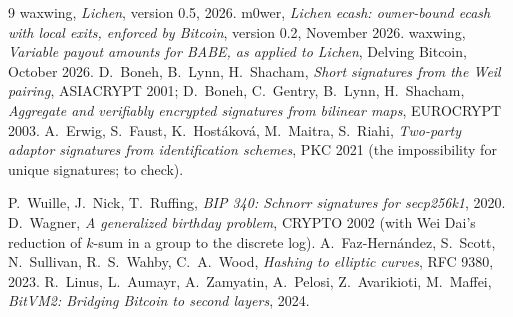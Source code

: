 \documentclass[11pt]{article}
\theoremstyle{plain}
\theoremstyle{definition}
\begin{document}
\begin{thebibliography}{9}
 waxwing, \emph{Lichen}, version 0.5, 2026.
 m0wer, \emph{Lichen ecash: owner-bound ecash with local
  exits, enforced by Bitcoin}, version 0.2, November 2026.
 waxwing, \emph{Variable payout amounts for BABE, as
  applied to Lichen}, Delving Bitcoin, October 2026.
 D.~Boneh, B.~Lynn, H.~Shacham, \emph{Short signatures from
  the Weil pairing}, ASIACRYPT 2001; D.~Boneh, C.~Gentry, B.~Lynn,
  H.~Shacham, \emph{Aggregate and verifiably encrypted signatures from
  bilinear maps}, EUROCRYPT 2003.
 A.~Erwig, S.~Faust, K.~Hostáková, M.~Maitra, S.~Riahi,
  \emph{Two-party adaptor signatures from identification schemes}, PKC
  2021 (the impossibility for unique signatures; to check).

 P.~Wuille, J.~Nick, T.~Ruffing, \emph{BIP 340: Schnorr
  signatures for secp256k1}, 2020.
 D.~Wagner, \emph{A generalized birthday problem},
  CRYPTO 2002 (with Wei Dai's reduction of $k$-sum in a group to the
  discrete log).
 A.~Faz-Hern\'andez, S.~Scott, N.~Sullivan,
  R.~S.~Wahby, C.~A.~Wood, \emph{Hashing to elliptic curves}, RFC 9380,
  2023.
 R.~Linus, L.~Aumayr, A.~Zamyatin, A.~Pelosi,
  Z.~Avarikioti, M.~Maffei, \emph{BitVM2: Bridging Bitcoin to second
  layers}, 2024.
\end{thebibliography}
\end{document}
